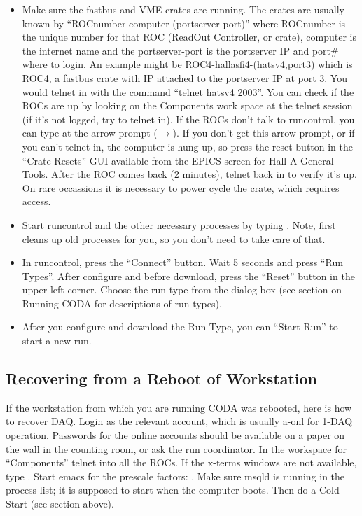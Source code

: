 {\begin{itemize}
\item{Make sure the fastbus and VME crates are
running.  The crates are usually known by 
``ROCnumber-computer-(portserver-port)''
where ROCnumber is the unique number for that
ROC (ReadOut Controller, or crate),
computer is the internet name and the 
portserver-port is the portserver IP and port\#
where to login.
An example might be \hskip 0.05in
ROC4-hallasfi4-(hatsv4,port3) which is 
ROC4, a fastbus crate with IP  attached
to the portserver IP  at port 3.
You would telnet in with the command ``telnet hatsv4 2003''.
You can check if the ROCs
are up by looking on the Components work space
at the telnet session (if it's not logged, 
try to telnet in).
If the ROCs don't talk to runcontrol, you can type
 at the arrow prompt ($\rightarrow$).   If you
don't get this arrow prompt, or if you can't telnet in,
the computer is hung up, so press 
the reset button in the ``Crate Resets'' GUI
available from the EPICS screen for
Hall A General Tools.
After the ROC comes back (2 minutes),
telnet back in to verify it's up.
On rare occassions it is necessary to
power cycle the crate, which requires access. }
\item{ Start runcontrol and the other necessary
processes by typing .  Note, 
 first cleans up old processes
for you, so you don't need to take care of that.}
\item{ In runcontrol,
press the ``Connect'' button.  
Wait 5 seconds and press ``Run Types''.  
After configure and before download, 
press the ``Reset'' button in the upper left corner.
Choose the run type from the dialog box
(see section on Running
CODA for descriptions of run types).}
\item{ After you configure and download the Run Type,
you can ``Start Run'' to start a new run.}


\end{itemize}


\subsection{ Recovering from a Reboot of Workstation}

If the workstation from which you are running CODA
was rebooted, here is how to recover DAQ.
Login as the relevant account, which is usually
a-onl for 1-DAQ operation. Passwords for the online
accounts should be available on a paper on the wall
in the counting room, or ask the run coordinator.
In the workspace for ``Components'' telnet into
all the ROCs.  If the x-terms windows are not 
available, type .  Start emacs
for the prescale factors: 
.
Make sure msqld is running in the process list;
it is supposed to start when the computer boots.
Then do a Cold Start (see section above).

}

